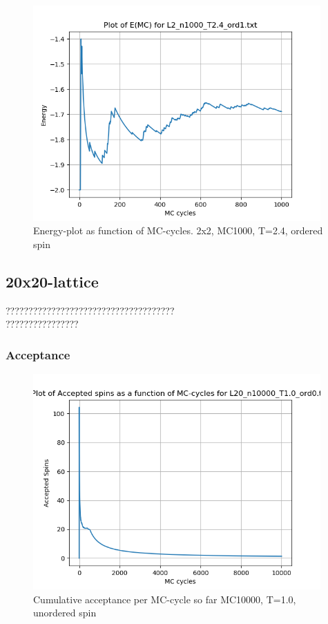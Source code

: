 \documentclass{article}
\begin{document}
  \begin{figure}[ht]
      \centering
      \includegraphics[width = 11cm]{img/energy_L2_n1000_T24_ord1.png}
      \caption{Energy-plot as function of MC-cycles. 2x2, MC1000, T=2.4, ordered spin}
      \label{fig:energy_L2_n1000_T2.4_ord1}
    \end{figure}

  \subsection{20x20-lattice}


  ????????????????????????????????????? \\
  ???????????????? \\


  \subsubsection{Acceptance}

  \begin{figure}[ht]
      \centering
      \includegraphics[width = 11cm]{img/accept_L20_n10000_T10_ord0.png}
      \caption{Cumulative acceptance per MC-cycle so far MC10000, T=1.0, unordered spin}
      \label{fig:accept_L20_n10000_T1.0_ord0}
    \end{figure}
\end{document}
